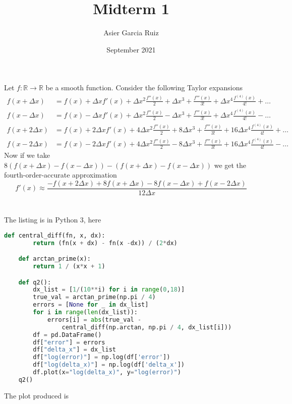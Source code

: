 \documentclass{article}
\title{Midterm 1}
\author{Asier Garcia Ruiz }
\date{September 2021}
\newcommand{\R}{\mathbb{R}}
\begin{document}
\maketitle

\section{} %
Let $f: \R \rightarrow \R$ be a smooth function. Consider the following Taylor
expansions
\begin{align*}
    f(x + \Delta x)  & = f(x) + \Delta x f'(x) + \Delta x^2 \frac{f''(x)}{2} +
    \Delta x^3 + \frac{f'''(x)}{3!} + \Delta x^4 \frac{f^{(4)}(x)}{4!} + \dots    \\
    f(x - \Delta x)  & = f(x) - \Delta x f'(x) + \Delta x^2 \frac{f''(x)}{2} -
    \Delta x^3 + \frac{f'''(x)}{3!} + \Delta x^4 \frac{f^{(4)}(x)}{4!} - \dots    \\
    f(x + 2\Delta x) & = f(x) + 2\Delta x f'(x) + 4\Delta x^2 \frac{f''(x)}{2} +
    8\Delta x^3 + \frac{f'''(x)}{3!} + 16\Delta x^4 \frac{f^{(4)}(x)}{4!} + \dots \\
    f(x - 2\Delta x) & = f(x) - 2\Delta x f'(x) + 4\Delta x^2 \frac{f''(x)}{2} -
    8\Delta x^3 + \frac{f'''(x)}{3!} + 16\Delta x^4 \frac{f^{(4)}(x)}{4!} - \dots
\end{align*}
Now if we take $8(f(x+\Delta x) - f(x - \Delta x)) - (f(x + \Delta x) - f(x - \Delta x))$
we get the fourth-order-accurate approximation
$$f'(x) \approx \frac{-f(x + 2\Delta x) + 8f(x + \Delta x) - 8f(x - \Delta x) + f(x-2\Delta x)}{12\Delta x}$$

\newpage

\section{} %
The listing is in Python 3, here

\begin{lstlisting}[language=Python]
    def central_diff(fn, x, dx):
        return (fn(x + dx) - fn(x -dx)) / (2*dx)

    def arctan_prime(x):
        return 1 / (x*x + 1)

    def q2():
        dx_list = [1/(10**i) for i in range(0,18)]
        true_val = arctan_prime(np.pi / 4)
        errors = [None for _ in dx_list]
        for i in range(len(dx_list)):
            errors[i] = abs(true_val -
                central_diff(np.arctan, np.pi / 4, dx_list[i]))
        df = pd.DataFrame()
        df["error"] = errors
        df["delta_x"] = dx_list
        df["log(error)"] = np.log(df['error'])
        df["log(delta_x)"] = np.log(df['delta_x'])
        df.plot(x="log(delta_x)", y="log(error)")
    q2()
\end{lstlisting}
The plot produced is
\end{document}
